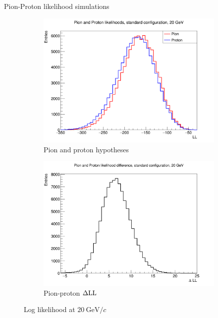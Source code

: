 \documentclass{beamer}
\begin{document}
\begin{frame}{Pion-Proton likelihood simulations}
  \begin{figure}
    \centering
    \vspace{-0.2cm}
    \begin{subfigure}{0.5\textwidth}
      \includegraphics[width = 1.0\textwidth]{Plots/ProtonPionLL20GeVStandard.png}
      \caption{Pion and proton hypotheses}
    \end{subfigure}%
    \begin{subfigure}{0.5\textwidth}
      \includegraphics[width = 1.0\textwidth]{Plots/ProtonPionDLL20GeVStandard.png}
      \caption{Pion-proton $\Delta{\rm LL}$}
    \end{subfigure}
    \caption{Log likelihood at $\SI{20}{\giga\eV/c}$}
  \end{figure}
\end{frame}
\end{document}
